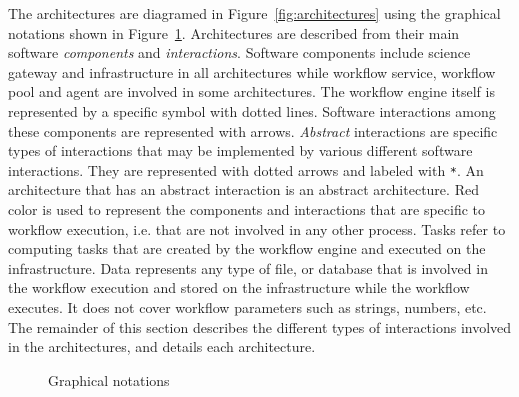 \documentclass[preprint,3p,twocolumn]{elsarticle}
\begin{document}
The architectures are diagramed in Figure~\ref{fig:architectures}
using the graphical notations shown in
Figure~\ref{fig:notations}. Architectures are described from their
main software \emph{components} and \emph{interactions}. Software
components include science gateway and infrastructure in all
architectures while workflow service, workflow pool and agent are
involved in some architectures. The workflow engine itself is
represented by a specific symbol with dotted lines. Software
interactions among these components are represented with
arrows. \emph{Abstract} interactions are specific types of
interactions that may be implemented by various different software
interactions. They are represented with dotted arrows and labeled with
 \texttt{*}. An architecture that has an abstract interaction is an
abstract architecture. Red color is used to represent the components
and interactions that are specific to workflow execution, i.e. that
are not involved in any other process. Tasks refer to computing tasks
that are created by the workflow engine and executed on the
infrastructure. Data represents any type of file, or database that is
involved in the workflow execution and stored on the infrastructure
while the workflow executes. It does not cover workflow parameters
such as strings, numbers, etc. The remainder of this section describes
the different types of interactions involved in the architectures, and
details each architecture.


\begin{figure}
\centering
\def\svgwidth{\columnwidth}

\caption{Graphical notations}
\label{fig:notations}
\end{figure}
\end{document}
